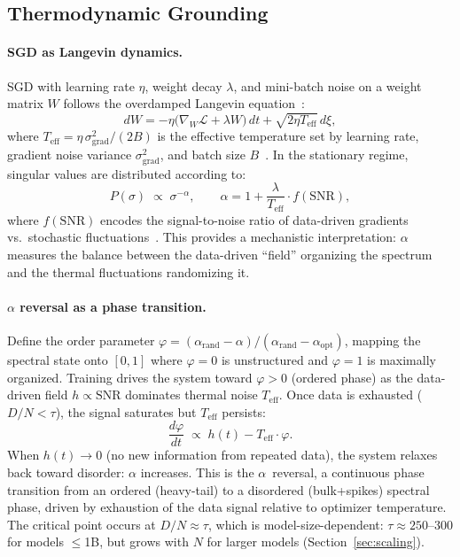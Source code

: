 \subsection{Thermodynamic Grounding}
\label{sec:thermo}

\paragraph{SGD as Langevin dynamics.}
SGD with learning rate $\eta$, weight decay $\lambda$, and mini-batch noise on a weight matrix $W$ follows the overdamped Langevin equation~\citep{liu_tegmark2025, pvnkt_ijcai2026}:
\begin{equation}
    dW = -\eta\bigl(\nabla_W \mathcal{L} + \lambda W\bigr)\,dt + \sqrt{2\eta T_{\mathrm{eff}}}\,d\xi,
    \label{eq:langevin}
\end{equation}
where $T_{\mathrm{eff}} = \eta\,\sigma^2_{\mathrm{grad}} / (2B)$ is the effective temperature set by learning rate, gradient noise variance $\sigma^2_{\mathrm{grad}}$, and batch size $B$~\citep{liu_tegmark2025}. In the stationary regime, singular values are distributed according to:
\begin{equation}
    P(\sigma) \;\propto\; \sigma^{-\alpha}, \qquad \alpha = 1 + \frac{\lambda}{T_{\mathrm{eff}}} \cdot f(\mathrm{SNR}),
    \label{eq:alpha_temperature}
\end{equation}
where $f(\mathrm{SNR})$ encodes the signal-to-noise ratio of data-driven gradients vs.\ stochastic fluctuations~\citep{sadrtdinov2025}. This provides a mechanistic interpretation: $\alpha$ measures the balance between the data-driven ``field'' organizing the spectrum and the thermal fluctuations randomizing it.

\paragraph{$\alpha$ reversal as a phase transition.}
Define the order parameter $\varphi = (\alpha_{\mathrm{rand}} - \alpha)/(\alpha_{\mathrm{rand}} - \alpha_{\mathrm{opt}})$, mapping the spectral state onto $[0,1]$ where $\varphi = 0$ is unstructured and $\varphi = 1$ is maximally organized. Training drives the system toward $\varphi > 0$ (ordered phase) as the data-driven field $h \propto \mathrm{SNR}$ dominates thermal noise $T_{\mathrm{eff}}$. Once data is exhausted ($D/N < \tau$), the signal saturates but $T_{\mathrm{eff}}$ persists:
\begin{equation}
    \frac{d\varphi}{dt} \;\propto\; h(t) - T_{\mathrm{eff}} \cdot \varphi.
    \label{eq:order_param}
\end{equation}
When $h(t) \to 0$ (no new information from repeated data), the system relaxes back toward disorder: $\alpha$ increases. This is the $\alpha$~reversal, a continuous phase transition from an ordered (heavy-tail) to a disordered (bulk+spikes) spectral phase, driven by exhaustion of the data signal relative to optimizer temperature. The critical point occurs at $D/N \approx \tau$, which is model-size-dependent: $\tau \approx 250$--$300$ for models $\leq$1B, but grows with $N$ for larger models (Section~\ref{sec:scaling}).

